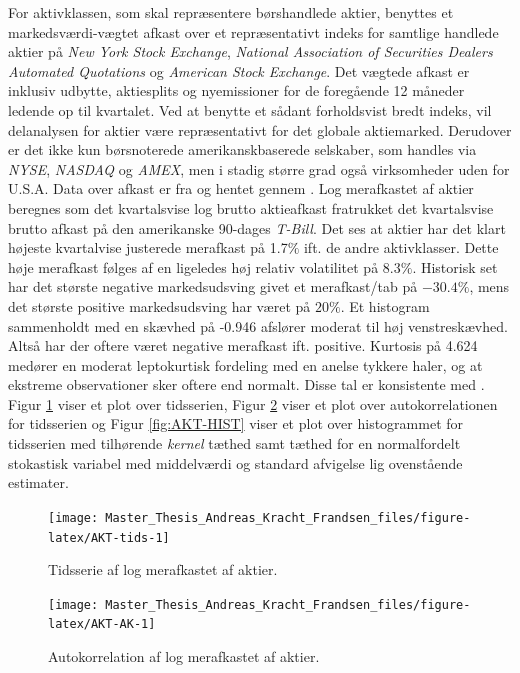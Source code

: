 \documentclass[
  a4paper,
  oneside]{memoir}
\begin{document}
For aktivklassen, som skal repræsentere børshandlede aktier, benyttes et markedsværdi-vægtet afkast over et repræsentativt indeks for samtlige handlede aktier på \emph{New York Stock Exchange}, \emph{National Association of Securities Dealers Automated Quotations} og \emph{American Stock Exchange}. Det vægtede afkast er inklusiv udbytte, aktiesplits og nyemissioner for de foregående 12 måneder ledende op til kvartalet. Ved at benytte et sådant forholdsvist bredt indeks, vil delanalysen for aktier være repræsentativt for det globale aktiemarked. Derudover er det ikke kun børsnoterede amerikanskbaserede selskaber, som handles via \emph{NYSE}, \emph{NASDAQ} og \emph{AMEX}, men i stadig større grad også virksomheder uden for U.S.A. Data over afkast er fra \citep{CRSPakt} og hentet gennem \citep{WRDSakt}. Log merafkastet af aktier beregnes som det kvartalsvise log brutto aktieafkast fratrukket det kvartalsvise brutto afkast på den amerikanske 90-dages \emph{T-Bill}. Det ses at aktier har det klart højeste kvartalvise justerede merafkast på 1.7\(\%\) ift. de andre aktivklasser. Dette høje merafkast følges af en ligeledes høj relativ volatilitet på 8.3\(\%\). Historisk set har det største negative markedsudsving givet et merafkast/tab på \(-30.4\%\), mens det største positive markedsudsving har været på \(20\%\). Et histogram sammenholdt med en skævhed på -0.946 afslører moderat til høj venstreskævhed. Altså har der oftere været negative merafkast ift. positive. Kurtosis på 4.624 medører en moderat leptokurtisk fordeling med en anelse tykkere haler, og at ekstreme observationer sker oftere end normalt. Disse tal er konsistente med \citep{CampVic2003}. Figur \ref{fig:AKT-tids} viser et plot over tidsserien, Figur \ref{fig:AKT-AK} viser et plot over autokorrelationen for tidsserien og Figur \ref{fig:AKT-HIST} viser et plot over histogrammet for tidsserien med tilhørende \emph{kernel} tæthed samt tæthed for en normalfordelt stokastisk variabel med middelværdi og standard afvigelse lig ovenstående estimater.

\begin{figure}[H]

{\centering \texttt{[image: Master\_Thesis\_Andreas\_Kracht\_Frandsen\_files/figure-latex/AKT-tids-1]} 

}

\caption{Tidsserie af log merafkastet af aktier.}\label{fig:AKT-tids}
\end{figure}

\begin{figure}[H]

{\centering \texttt{[image: Master\_Thesis\_Andreas\_Kracht\_Frandsen\_files/figure-latex/AKT-AK-1]} 

}

\caption{Autokorrelation af log merafkastet af aktier.}\label{fig:AKT-AK}
\end{figure}
\end{document}
